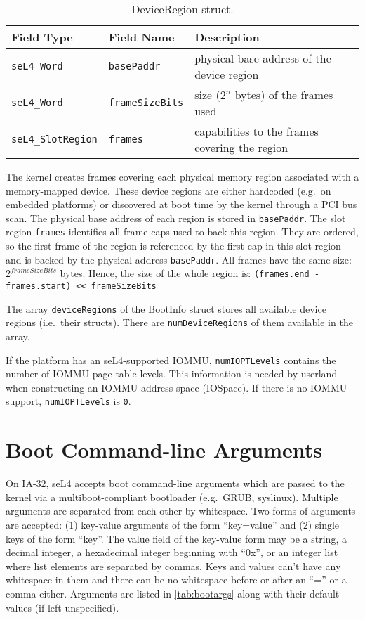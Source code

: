 \begin{table}[htb]
  \begin{center}
    \caption{DeviceRegion struct.}
    \label{tab:device_region_struct}
    \begin{tabular}{lll}
      \toprule
      Field Type & Field Name & Description \\
      \midrule
      \texttt{seL4\_Word}       & \texttt{basePaddr}     & physical base address of the device region \\
      \texttt{seL4\_Word}       & \texttt{frameSizeBits} & size ($2^n$ bytes) of the frames used \\
      \texttt{seL4\_SlotRegion} & \texttt{frames}        & capabilities to the frames covering the region \\
      \bottomrule
    \end{tabular}
  \end{center}
\end{table}

The kernel creates frames covering each physical memory region associated with
a memory-mapped device. These device regions are either hardcoded (e.g.\ on
embedded platforms) or discovered at boot time by the kernel through a PCI bus
scan. The physical base address of each region is stored in \texttt{basePaddr}.
The slot region \texttt{frames} identifies all frame caps used to back this
region. They are ordered, so the first frame of the region is referenced by the
first cap in this slot region and is backed by the physical address
\texttt{basePaddr}. All frames have the same size: $2^{frameSizeBits}$ bytes.
Hence, the size of the whole region is:
\texttt{(frames.end - frames.start) << frameSizeBits}

The array \texttt{deviceRegions} of the BootInfo struct stores all available
device regions (i.e.\ their structs). There are \texttt{numDeviceRegions} of
them available in the array.

If the platform has an seL4-supported IOMMU, \texttt{numIOPTLevels} contains
the number of IOMMU-page-table levels. This information is needed by userland
when constructing an IOMMU address space (IOSpace). If there is no IOMMU
support, \texttt{numIOPTLevels} is \texttt{0}.

\ifxeightsix
\section{Boot Command-line Arguments}

On IA-32, seL4 accepts boot command-line arguments which are passed to the
kernel via a multiboot-compliant bootloader (e.g.\ GRUB, syslinux). Multiple
arguments are separated from each other by whitespace. Two forms of arguments
are accepted:
(1) key-value arguments of the form ``key=value'' and (2) single keys of the
form ``key''. The value field of the key-value form may be a string, a decimal
integer, a hexadecimal integer beginning with ``0x'', or an integer list where
list elements are separated by commas.
Keys and values can't have any whitespace in them and there can be no
whitespace before or after an ``='' or a comma either.
Arguments are listed in \autoref{tab:bootargs} along with their default values (if left unspecified).


